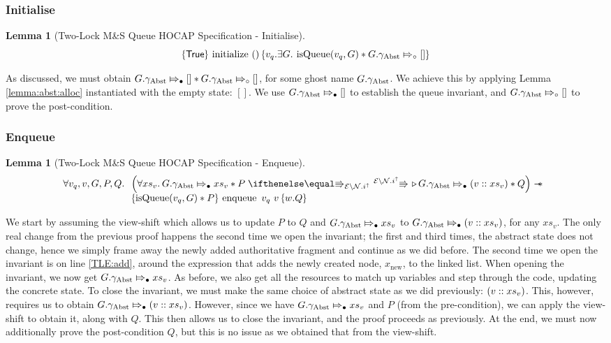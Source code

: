 \documentclass[a4paper, 10pt]{report}
\theoremstyle{definition}
\newtheorem{lemma}[theorem]{Lemma}
\newcommand{\initialise}{\operatorname{initialize}}
\newcommand{\enqueue}{\operatorname{enqueue}}
\newcommand{\msq}{M\&S Queue}
\newcommand{\tlmsq}{Two-Lock \msq{}}
\newcommand{\isqueue}{\operatorname{isQueue}}
\newcommand{\vq}{v_q}
\newcommand{\node}{x}
\newcommand{\nodeN}[1]{\node_{\mathrm{#1}}}
\newcommand{\nodenew}{\nodeN{new}}
\newcommand{\absvalue}{\val}
\newcommand{\absvalueList}{xs_v}
\newcommand{\Qg}{G}
\newcommand{\gabst}{\gname_{\mathrm{Abst}}}
\newcommand{\Nl}{\ensuremath{\mathcal{N}}}
\newcommand{\abstractstatefullfrag}[2]{#1 \Mapsto_{\circ} #2}
\newcommand{\abstractstateauth}[2]{#1 \Mapsto_{\bullet} #2}
\newcommand{\hocapspecinitHTGen}[2]{\hoare{\TRUE}{\initialise \ \TT}{#1 . \Exists #2 . \isqueue(#1, #2) \star{} \abstractstatefullfrag{#2.\gabst}{[]}}}
\newcommand{\hocapspecinitGen}[2]{\hocapspecinitHTGen{#1}{#2}}
\newcommand{\hocapspecinit}{\hocapspecinitGen{\vq}{\Qg}}
\newcommand{\hocapspecenqVS}[5]{\abstractstateauth{#2.\gabst}{#5} \star{} #3 \vs[\mask\setminus\Nl.i^\uparrow] \later \abstractstateauth{#2.\gabst}{(#1 :: #5)} \star{} #4}
\newcommand{\hocapspecenqHT}[5]{\hoare{\isqueue(#1, #3) \star{} #4}{\enqueue \ #1 \ #2}{\valB . #5}}
\newcommand{\hocapspecenqGen}[6]{\All #1, #2, #3, #4, #5.
\begin{array}[t]{l}
\left(\All #6 . \hocapspecenqVS{#2}{#3}{#4}{#5}{#6} \right)
\wand\\
\hocapspecenqHT{#1}{#2}{#3}{#4}{#5}
\end{array}}
\newcommand{\hocapspecenq}{\hocapspecenqGen{\vq}{\absvalue}{\Qg}{P}{Q}{\absvalueList}}
\begin{document}
\subsubsection{Initialise}
\begin{lemma}[\tlmsq{} HOCAP Specification - Initialise]\label{TLMSQ:spec:hocap:initialise}
  \begin{equation*}
    \hocapspecinit
  \end{equation*}
\end{lemma}
As discussed, we must obtain $\abstractstateauth{\Qg.\gabst}{[]} \star{} \abstractstatefullfrag{\Qg.\gabst}{[]}$, for some ghost name $\Qg.\gabst$. We achieve this by applying Lemma \ref{lemma:abst:alloc} instantiated with the empty state: $[]$. We use $\abstractstateauth{\Qg.\gabst}{[]}$ to establish the queue invariant, and $\abstractstatefullfrag{\Qg.\gabst}{[]}$ to prove the post-condition.


\subsubsection{Enqueue}
\begin{lemma}[\tlmsq{} HOCAP Specification - Enqueue]\label{TLMSQ:spec:hocap:enqueue}
  \begin{equation*}
    \hocapspecenq
  \end{equation*}
\end{lemma}
We start by assuming the view-shift which allows us to update $P$ to $Q$ and $\abstractstateauth{\Qg.\gabst}{\absvalueList}$ to $\abstractstateauth{\Qg.\gabst}{(\absvalue :: \absvalueList)}$, for any $\absvalueList$. The only real change from the previous proof happens the second time we open the invariant; the first and third times, the abstract state does not change, hence we simply frame away the newly added authoritative fragment and continue as we did before. The second time we open the invariant is on line \ref{TLE:add}, around the expression that adds the newly created node, $\nodenew$, to the linked list. When opening the invariant, we now get $\abstractstateauth{\Qg.\gabst}{\absvalueList}$. As before, we also get all the resources to match up variables and step through the code, updating the concrete state. To close the invariant, we must make the same choice of abstract state as we did previously: $(\absvalue :: \absvalueList)$. This, however, requires us to obtain $\abstractstateauth{\Qg.\gabst}{(\absvalue :: \absvalueList)}$. However, since we have $\abstractstateauth{\Qg.\gabst}{\absvalueList}$ and $P$ (from the pre-condition), we can apply the view-shift to obtain it, along with $Q$. This then allows us to close the invariant, and the proof proceeds as previously. At the end, we must now additionally prove the post-condition $Q$, but this is no issue as we obtained that from the view-shift.
\end{document}
